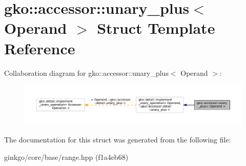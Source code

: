 \hypertarget{structgko_1_1accessor_1_1unary__plus}{}\section{gko\+:\+:accessor\+:\+:unary\+\_\+plus$<$ Operand $>$ Struct Template Reference}
\label{structgko_1_1accessor_1_1unary__plus}


Collaboration diagram for gko\+:\+:accessor\+:\+:unary\+\_\+plus$<$ Operand $>$\+:
\nopagebreak
\begin{figure}[H]
\begin{center}
\leavevmode
\includegraphics[width=350pt]{structgko_1_1accessor_1_1unary__plus__coll__graph}
\end{center}
\end{figure}


The documentation for this struct was generated from the following file\+:\begin{DoxyCompactItemize}
\item 
ginkgo/core/base/range.\+hpp (f1a4eb68)\end{DoxyCompactItemize}
